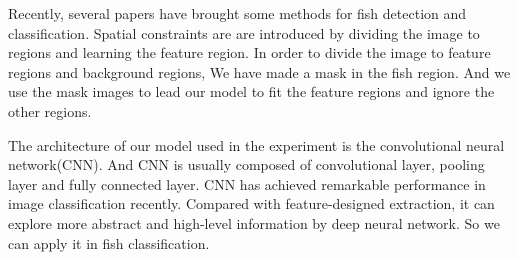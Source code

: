\documentclass[conference]{IEEEtran}
\begin{document}
Recently, several papers have brought some methods for fish detection and classification\cite{chuang2016feature}. Spatial constraints are are introduced by dividing the image to regions and learning the feature region\cite{anantharajah2014local}. In order to divide the image to feature regions and background regions, We have made a mask in the fish region. And we use the mask images to lead our model to fit the feature regions and ignore the other regions.\cite{ge2015modelling} 

\par
The architecture of our model used in the experiment is the convolutional neural network(CNN). And CNN is usually composed of convolutional layer, pooling layer and fully connected layer. CNN has achieved remarkable performance in image classification recently. Compared with feature-designed extraction, it can explore more abstract and high-level information by deep neural network. So we can apply it in fish classification. 











 




\end{document}
